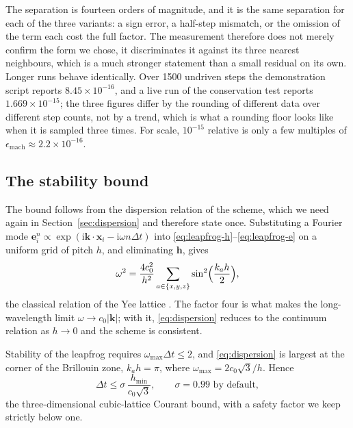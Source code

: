 The separation is fourteen orders of magnitude, and it is the same separation for each of the three variants: a
sign error, a half-step mismatch, or the omission of the term each cost the full factor. The measurement therefore
does not merely confirm the form we chose, it discriminates it against its three nearest neighbours, which is a
much stronger statement than a small residual on its own. Longer runs behave identically. Over 1500 undriven steps
the demonstration script reports $8.45\times10^{-16}$, and a live run of the conservation test reports
$1.669\times10^{-15}$; the three figures differ by the rounding of different data over different step counts, not
by a trend, which is what a rounding floor looks like when it is sampled three times. For scale,
$10^{-15}$ relative is only a few multiples of $\epsilon_{\mathrm{mach}}\approx2.2\times10^{-16}$.

\subsection{The stability bound}
\label{sec:cfl}

The bound follows from the dispersion relation of the scheme, which we need again in Section~\ref{sec:dispersion}
and therefore state once. Substituting a Fourier mode $\mathbf{e}^{n}_i\propto\exp(\mathrm{i}\mathbf{k}\cdot
\mathbf{x}_i-\mathrm{i}\omega n\Delta t)$ into \eqref{eq:leapfrog-h}--\eqref{eq:leapfrog-e} on a uniform grid of
pitch $h$, and eliminating $\mathbf{h}$, gives
\begin{equation}
  \omega^2 = \frac{4c_0^2}{h^2}\sum_{a\in\{x,y,z\}}\sin^2\Bigl(\frac{k_a h}{2}\Bigr),
  \label{eq:dispersion}
\end{equation}
the classical relation of the Yee lattice \cite{yee1966,taflove2005}. The factor four is what makes the
long-wavelength limit $\omega\to c_0|\mathbf{k}|$; with it, \eqref{eq:dispersion} reduces to the continuum
relation as $h\to0$ and the scheme is consistent.

Stability of the leapfrog requires $\omega_{\max}\Delta t\le2$, and \eqref{eq:dispersion} is largest at the corner
of the Brillouin zone, $k_a h=\pi$, where $\omega_{\max}=2c_0\sqrt{3}/h$. Hence
\begin{equation}
  \Delta t \le \sigma\,\frac{h_{\min}}{c_0\sqrt{3}}, \qquad \sigma=0.99 \text{ by default},
  \label{eq:cfl}
\end{equation}
the three-dimensional cubic-lattice Courant bound, with a safety factor we keep strictly below one.

